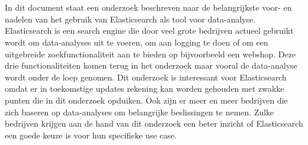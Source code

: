 




\chapter*{}

In dit document staat een onderzoek beschreven naar de belangrijkste voor- en nadelen van het gebruik van
Elasticsearch als tool voor data-analyse. Elasticsearch is een search engine die door veel grote bedrijven actueel gebruikt wordt om data-analyses uit te voeren, om aan logging te doen of om een uitgebreide zoekfunctionaliteit aan te bieden op bijvoorbeeld een webshop. Deze drie functionaliteiten komen terug in het onderzoek maar vooral de data-analyse wordt onder de loep genomen. Dit onderzoek is interessant voor Elasticsearch omdat er in toekomstige updates rekening kan worden gehouden met zwakke punten die in dit onderzoek opduiken. Ook zijn er meer en meer bedrijven die zich baseren op data-analyses om belangrijke beslissingen te nemen. Zulke bedrijven krijgen aan de hand van dit onderzoek een beter inzicht of Elasticsearch een goede keuze is voor hun specifieke use case.

